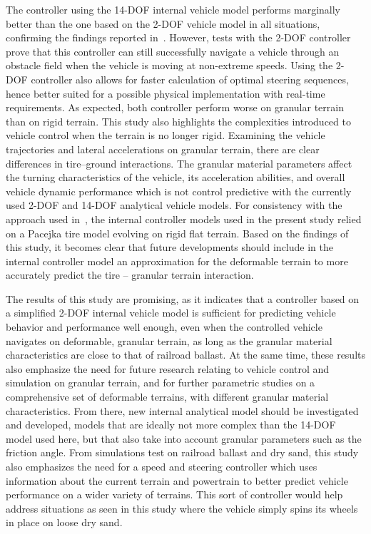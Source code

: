 \documentclass[12pt,twocolumn]{article}
\begin{document}
The controller using the 14-DOF internal vehicle model performs marginally better than the one based on the 2-DOF vehicle model in all situations, confirming the findings reported in~\cite{ModelFidelity2016}. However, tests with the 2-DOF controller prove that this controller can still successfully navigate a vehicle through an obstacle field when the vehicle is moving at non-extreme speeds. Using the 2-DOF controller also allows for faster calculation of optimal steering sequences, hence better suited for a possible physical implementation with real-time requirements. 
%
As expected, both controller perform worse on granular terrain than on rigid terrain.
%
This study also highlights the complexities introduced to vehicle control when the terrain is no longer rigid. Examining the vehicle trajectories and lateral accelerations on granular terrain, there are clear differences in tire--ground interactions. The granular material parameters affect the turning characteristics of the vehicle, its acceleration abilities, and overall vehicle dynamic performance which is not control predictive with the currently used 2-DOF and 14-DOF analytical vehicle models. 
%
For consistency with the approach used in~\cite{ModelFidelity2016}, the internal controller models used in the present study relied on a Pacejka tire model evolving on rigid flat terrain. Based on the findings of this study, it becomes clear that future developments should include in the internal controller model an approximation for the deformable terrain to more accurately predict the tire -- granular terrain interaction.


The results of this study are promising, as it indicates that a controller based on a simplified 2-DOF internal vehicle model is sufficient for predicting vehicle behavior and performance well enough, even when the controlled vehicle navigates on deformable, granular terrain, as long as the granular material characteristics are close to that of railroad ballast.
%
At the same time, these results also emphasize the need for future research relating to vehicle control and simulation on granular terrain, and for further parametric studies on a comprehensive set of deformable terrains, with different granular material characteristics.  From there, new internal analytical model should be investigated and developed, models that are ideally not more complex than the 14-DOF model used here, but that also take into account granular parameters such as the friction angle. 
%
From simulations test on railroad ballast and dry sand, this study also emphasizes the need for a speed and steering controller which uses information about the current terrain and powertrain to better predict vehicle performance on a wider variety of terrains. This sort of controller would help address situations as seen in this study where the vehicle simply spins its wheels in place on loose dry sand. 
\end{document}
